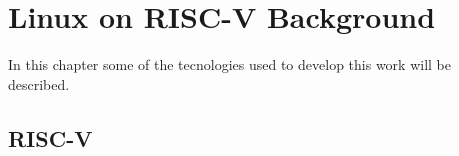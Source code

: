 \chapter{Linux on RISC-V Background}
\label{chapter:background}

\quad In this chapter some of the tecnologies used to develop this work will be described.
\section{RISC-V}



\newpage
